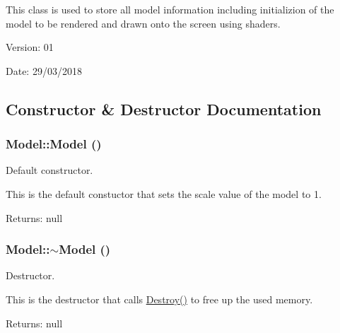 This class is used to store all model information including initializion of the model to be rendered and drawn onto the screen using shaders.

\begin{Desc}
\item[Version:]01 \end{Desc}
\begin{Desc}
\item[Date:]29/03/2018 \end{Desc}


\subsection{Constructor \& Destructor Documentation}
\hypertarget{class_model_e3b375de5f6df4faf74a95d64748e048}{
\subsubsection[Model]{\setlength{\rightskip}{0pt plus 5cm}Model::Model ()}}
\label{class_model_e3b375de5f6df4faf74a95d64748e048}


Default constructor. 

This is the default constuctor that sets the scale value of the model to 1.

\begin{Desc}
\item[Returns:]null \end{Desc}
\hypertarget{class_model_d6ebd2062a0b823db841a0b88baac4c0}{
\subsubsection[$\sim$Model]{\setlength{\rightskip}{0pt plus 5cm}Model::$\sim$Model ()}}
\label{class_model_d6ebd2062a0b823db841a0b88baac4c0}


Destructor. 

This is the destructor that calls \hyperlink{class_model_d60ed0ed7eaa7dcdd58398e6efacc7c4}{Destroy()} to free up the used memory.

\begin{Desc}
\item[Returns:]null \end{Desc}


